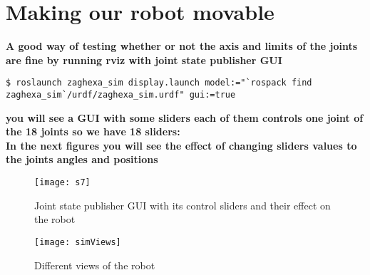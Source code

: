 \section{Making our robot movable}
\textbf{A good way of testing whether or not the axis and limits of the joints are fine by running rviz with joint state publisher GUI}
\begin{lstlisting}[language=terCmd]
$ roslaunch zaghexa_sim display.launch model:="`rospack find zaghexa_sim`/urdf/zaghexa_sim.urdf" gui:=true
\end{lstlisting}


\textbf{you will see a GUI with some sliders each of them controls one joint of the 18 joints so we have 18 sliders:}
\\\textbf{In the next figures you will see the effect of changing sliders values to the joints angles and positions}
\begin{figure}[h]
	\centering
	\texttt{[image: s7]}
	\caption{Joint state publisher GUI with its control sliders and their effect on the robot }
	\label{fig:s7}
\end{figure}
\begin{figure}[htb]
	\centering
	\texttt{[image: simViews]}
    	\caption{Different views of the robot}
\end{figure}